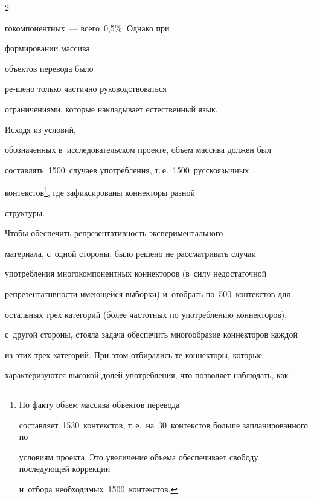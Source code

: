\begin{multicols}{2}








  





\noindent


гокомпонентных~--- всего~0,5\%. Однако при


  формировании массива 


объектов перевода было %


 ре-\linebreak шено только частично руководствоваться 


огра\-ничениями, которые накладывает естественный язык.


 Ис\-ходя из условий, 


обозначенных в~исследовательском проекте, объем массива должен был 


со\-став\-лять~1500~случаев употребления, т.\,е.~1500~русскоязычных 


контекстов\footnote{По факту объем массива объектов перевода 


составляет~1530~контекстов, т.\,е.\ на~30~контекстов больше запланированного по 


условиям проекта. Это увеличение объема обеспечивает свободу последующей коррекции 


и~отбора необходимых~1500~контекстов.}, где зафиксированы коннекторы разной 


структуры. 





Чтобы обеспечить репрезентативность экспериментального 


материала, с~одной стороны, было решено не рассматривать случаи 


употребления многокомпонентных коннекторов (в~силу недостаточной 


репрезентативности имеющейся выборки) и~отобрать по~500~контекстов для 


остальных трех категорий (более частотных по употреблению коннекторов), 


с~другой стороны, стояла задача обеспечить многообразие коннекторов каждой 


из этих трех категорий. При этом отбирались те коннекторы, которые 


характеризуются высокой долей употребления, что позволяет наблюдать, как 



\end{multicols}
